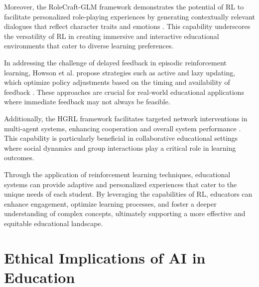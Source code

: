 Moreover, the RoleCraft-GLM framework demonstrates the potential of RL to facilitate personalized role-playing experiences by generating contextually relevant dialogues that reflect character traits and emotions \cite{tao2024rolecraftglmadvancingpersonalizedroleplaying}. This capability underscores the versatility of RL in creating immersive and interactive educational environments that cater to diverse learning preferences.



In addressing the challenge of delayed feedback in episodic reinforcement learning, Howson et al. propose strategies such as active and lazy updating, which optimize policy adjustments based on the timing and availability of feedback \cite{howson2023optimismdelaysepisodicreinforcement}. These approaches are crucial for real-world educational applications where immediate feedback may not always be feasible.



Additionally, the HGRL framework facilitates targeted network interventions in multi-agent systems, enhancing cooperation and overall system performance \cite{chen2024adaptivenetworkinterventioncomplex}. This capability is particularly beneficial in collaborative educational settings where social dynamics and group interactions play a critical role in learning outcomes.



Through the application of reinforcement learning techniques, educational systems can provide adaptive and personalized experiences that cater to the unique needs of each student. By leveraging the capabilities of RL, educators can enhance engagement, optimize learning processes, and foster a deeper understanding of complex concepts, ultimately supporting a more effective and equitable educational landscape.














\section{Ethical Implications of AI in Education} \label{sec:Ethical Implications of AI in Education}

